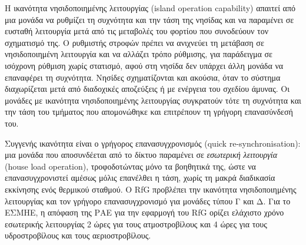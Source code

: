 Η ικανότητα νησιδοποιημένης λειτουργίας (island operation capability) απαιτεί από μια μονάδα
να ρυθμίζει τη συχνότητα και την τάση της νησίδας και να παραμένει σε ευσταθή λειτουργία μετά από
τις μεταβολές του φορτίου που συνοδεύουν τον σχηματισμό της. Ο ρυθμιστής στροφών πρέπει να
ανιχνεύει τη μετάβαση σε νησιδοποιημένη λειτουργία και να αλλάζει τρόπο ρύθμισης, για παράδειγμα σε
ισόχρονη ρύθμιση χωρίς στατισμό, αφού στη νησίδα δεν υπάρχει άλλη μονάδα να επαναφέρει τη
συχνότητα. Νησίδες σχηματίζονται και ακούσια, όταν το σύστημα διαχωρίζεται μετά από διαδοχικές
αποζεύξεις ή με ενέργεια του σχεδίου άμυνας. Οι μονάδες με ικανότητα νησιδοποιημένης λειτουργίας
συγκρατούν τότε τη συχνότητα και την τάση του τμήματος που απομονώθηκε και επιτρέπουν τη
γρήγορη επανασύνδεσή του.

Συγγενής ικανότητα είναι ο γρήγορος επανασυγχρονισμός (quick re-synchronisation): μια μονάδα
που αποσυνδέεται από το δίκτυο παραμένει σε \emph{εσωτερική λειτουργία} (house load operation),
τροφοδοτώντας μόνο τα βοηθητικά της, ώστε να επανασυγχρονιστεί αμέσως μόλις επανέλθει η τάση,
χωρίς τη μακρά διαδικασία εκκίνησης ενός θερμικού σταθμού. Ο RfG προβλέπει την ικανότητα
νησιδοποιημένης λειτουργίας και τον γρήγορο επανασυγχρονισμό για μονάδες τύπου Γ και Δ. Για το
ΕΣΜΗΕ, η απόφαση της ΡΑΕ για την εφαρμογή του RfG ορίζει ελάχιστο χρόνο εσωτερικής λειτουργίας
2 ώρες για τους ατμοστροβίλους και 4 ώρες για τους υδροστροβίλους και τους αεριοστροβίλους.

